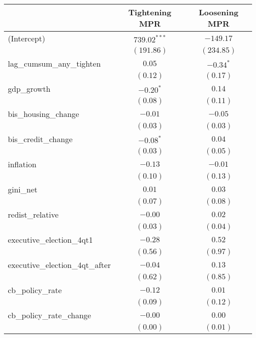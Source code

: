 
\begin{tabular}{l c c }
\hline
 & Tightening MPR & Loosening MPR \\
\hline
(Intercept)                     & $739.02^{***}$ & $-149.17$   \\
                                & $(191.86)$     & $(234.85)$  \\
lag\_cumsum\_any\_tighten       & $0.05$         & $-0.34^{*}$ \\
                                & $(0.12)$       & $(0.17)$    \\
gdp\_growth                     & $-0.20^{*}$    & $0.14$      \\
                                & $(0.08)$       & $(0.11)$    \\
bis\_housing\_change            & $-0.01$        & $-0.05$     \\
                                & $(0.03)$       & $(0.03)$    \\
bis\_credit\_change             & $-0.08^{*}$    & $0.04$      \\
                                & $(0.03)$       & $(0.05)$    \\
inflation                       & $-0.13$        & $-0.01$     \\
                                & $(0.10)$       & $(0.13)$    \\
gini\_net                       & $0.01$         & $0.03$      \\
                                & $(0.07)$       & $(0.08)$    \\
redist\_relative                & $-0.00$        & $0.02$      \\
                                & $(0.03)$       & $(0.04)$    \\
executive\_election\_4qt1       & $-0.28$        & $0.52$      \\
                                & $(0.56)$       & $(0.97)$    \\
executive\_election\_4qt\_after & $-0.04$        & $0.13$      \\
                                & $(0.62)$       & $(0.85)$    \\
cb\_policy\_rate                & $-0.12$        & $0.01$      \\
                                & $(0.09)$       & $(0.12)$    \\
cb\_policy\_rate\_change        & $-0.00$        & $0.00$      \\
                                & $(0.00)$       & $(0.01)$    \\

\end{tabular}
